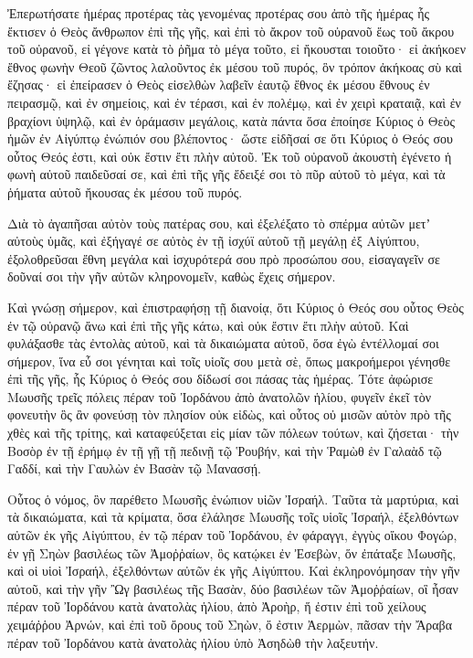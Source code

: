{\par }{\PP {}Ἐπερωτήσατε ἡμέρας προτέρας τὰς γενομένας προτέρας σου ἀπὸ τῆς ἡμέρας ἧς ἔκτισεν ὁ Θεὸς ἄνθρωπον ἐπὶ τῆς γῆς, καὶ ἐπὶ τὸ ἄκρον τοῦ οὐρανοῦ ἕως τοῦ ἄκρου τοῦ οὐρανοῦ, εἰ γέγονε κατὰ τὸ ῥῆμα τὸ μέγα τοῦτο, εἰ ἤκουσται τοιοῦτο· εἰ ἀκήκοεν ἔθνος φωνὴν
Θεοῦ ζῶντος λαλοῦντος ἐκ μέσου τοῦ πυρός, ὃν τρόπον ἀκήκοας σὺ καὶ ἔζησας·
εἰ ἐπείρασεν ὁ Θεὸς εἰσελθὼν λαβεῖν ἑαυτῷ ἔθνος ἐκ μέσου ἔθνους ἐν πειρασμῷ, καὶ ἐν σημείοις, καὶ ἐν τέρασι, καὶ ἐν πολέμῳ, καὶ ἐν χειρὶ κραταιᾷ, καὶ ἐν βραχίονι ὑψηλῷ, καὶ ἐν ὁράμασιν μεγάλοις, κατὰ πάντα ὅσα ἐποίησε Κύριος ὁ Θεὸς ἡμῶν ἐν Αἰγύπτῳ ἐνώπιόν σου βλέποντος·
ὥστε εἰδῆσαί σε ὅτι Κύριος ὁ Θεός σου οὗτος Θεός ἐστι, καὶ οὐκ ἔστιν ἔτι πλὴν αὐτοῦ.
Ἐκ τοῦ οὐρανοῦ ἀκουστὴ ἐγένετο ἡ φωνὴ αὐτοῦ παιδεῦσαί σε, καὶ ἐπὶ τῆς γῆς ἔδειξέ σοι τὸ πῦρ αὐτοῦ τὸ μέγα, καὶ τὰ ῥήματα αὐτοῦ ἤκουσας ἐκ μέσου τοῦ πυρός.
\par }{\PP {}Διὰ τὸ ἀγαπῆσαι αὐτὸν τοὺς πατέρας σου, καὶ ἐξελέξατο τὸ σπέρμα αὐτῶν μετʼ αὐτοὺς ὑμᾶς, καὶ ἐξήγαγέ σε αὐτὸς ἐν τῇ ἰσχύϊ αὐτοῦ τῇ μεγάλῃ ἐξ Αἰγύπτου,
ἐξολοθρεῦσαι ἔθνη μεγάλα καὶ ἰσχυρότερά σου πρὸ προσώπου σου, εἰσαγαγεῖν σε δοῦναί σοι τὴν γῆν αὐτῶν κληρονομεῖν, καθὼς ἔχεις σήμερον.
\par }{\PP {}Καὶ γνώσῃ σήμερον, καὶ ἐπιστραφήσῃ τῇ διανοίᾳ, ὅτι Κύριος ὁ Θεός σου οὗτος Θεὸς ἐν τῷ οὐρανῷ ἄνω καὶ ἐπὶ τῆς γῆς κάτω, καὶ οὐκ ἔστιν ἔτι πλὴν αὐτοῦ.
Καὶ φυλάξασθε τὰς ἐντολὰς αὐτοῦ, καὶ τὰ δικαιώματα αὐτοῦ, ὅσα ἐγὼ ἐντέλλομαί σοι σήμερον, ἵνα εὖ σοι γένηται καὶ τοῖς υἱοῖς σου μετὰ σὲ, ὅπως μακροήμεροι γένησθε ἐπὶ τῆς γῆς, ἧς Κύριος ὁ Θεός σου δίδωσί σοι πάσας τὰς ἡμέρας.
Τότε ἀφώρισε Μωυσῆς τρεῖς πόλεις πέραν τοῦ Ἰορδάνου ἀπὸ ἀνατολῶν ἡλίου,
φυγεῖν ἐκεῖ τὸν φονευτὴν ὃς ἂν φονεύσῃ τὸν πλησίον οὐκ εἰδὼς, καὶ οὗτος οὐ μισῶν αὐτὸν πρὸ τῆς χθὲς καὶ τῆς τρίτης, καὶ καταφεύξεται εἰς μίαν τῶν πόλεων τούτων, καὶ ζήσεται·
τὴν Βοσὸρ ἐν τῇ ἐρήμῳ ἐν τῇ γῇ τῇ πεδινῇ τῷ Ῥουβήν, καὶ τὴν Ῥαμὼθ ἐν Γαλαὰδ τῷ Γαδδί, καὶ τὴν Γαυλὼν ἐν Βασὰν τῷ Μανασσῄ.
\par }{\PP {}Οὗτος ὁ νόμος, ὃν παρέθετο Μωυσῆς ἐνώπιον υἱῶν Ἰσραήλ.
Ταῦτα τὰ μαρτύρια, καὶ τὰ δικαιώματα, καὶ τὰ κρίματα, ὅσα ἐλάλησε Μωυσῆς τοῖς υἱοῖς Ἰσραήλ, ἐξελθόντων αὐτῶν ἐκ γῆς Αἰγύπτου,
ἐν τῷ πέραν τοῦ Ἰορδάνου, ἐν φάραγγι, ἐγγὺς οἴκου Φογώρ, ἐν γῇ Σηὼν βασιλέως τῶν Ἀμοῤῥαίων, ὃς κατῴκει ἐν Ἐσεβὼν, ὅν ἐπάταξε Μωυσῆς, καὶ οἱ υἱοὶ Ἰσραήλ, ἐξελθόντων αὐτῶν ἐκ γῆς Αἰγύπτου.
Καὶ ἐκληρονόμησαν τὴν γῆν αὐτοῦ, καὶ τὴν γῆν Ὢγ βασιλέως τῆς Βασὰν, δύο βασιλέων τῶν Ἀμοῤῥαίων, οἳ ἦσαν πέραν τοῦ Ἰορδάνου κατὰ ἀνατολὰς ἡλίου,
ἀπὸ Ἀροὴρ, ἥ ἐστιν ἐπὶ τοῦ χείλους χειμάῤῥου Ἀρνών, καὶ ἐπὶ τοῦ ὄρους τοῦ Σηὼν, ὅ ἐστιν Ἀερμὼν,
πᾶσαν τὴν Ἄραβα πέραν τοῦ Ἰορδάνου κατὰ ἀνατολὰς ἡλίου ὑπὸ Ἀσηδὼθ τὴν λαξευτήν.

}
